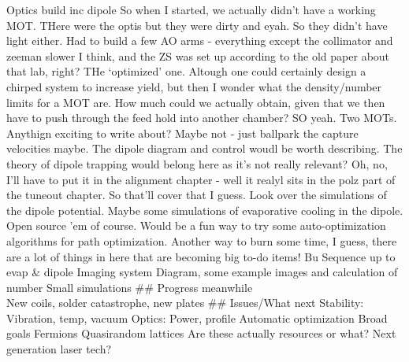 Optics build inc dipole So when I started, we actually didn't have a
working MOT. THere were the optis but they were dirty and eyah. So they
didn't have light either. Had to build a few AO arms - everything except
the collimator and zeeman slower I think, and the ZS was set up
according to the old paper about that lab, right? THe `optimized' one.
Altough one could certainly design a chirped system to increase yield,
but then I wonder what the density/number limits for a MOT are. How much
could we actually obtain, given that we then have to push through the
feed hold into another chamber? SO yeah. Two MOTs. Anythign exciting to
write about? Maybe not - just ballpark the capture velocities maybe. The
dipole diagram and control woudl be worth describing. The theory of
dipole trapping would belong here as it's not really relevant? Oh, no,
I'll have to put it in the alignment chapter - well it realyl sits in
the polz part of the tuneout chapter. So that'll cover that I guess.
Look over the simulations of the dipole potential. Maybe some
simulations of evaporative cooling in the dipole. Open source 'em of
course. Would be a fun way to try some auto-optimization algorithms for
path optimization. Another way to burn some time, I guess, there are a
lot of things in here that are becoming big to-do items! Bu Sequence up
to evap \& dipole Imaging system Diagram, some example images and
calculation of number Small simulations \#\# Progress meanwhile\\
New coils, solder catastrophe, new plates \#\# Issues/What next
Stability: Vibration, temp, vacuum Optics: Power, profile Automatic
optimization Broad goals Fermions Quasirandom lattices Are these
actually resources or what? Next generation laser tech?

